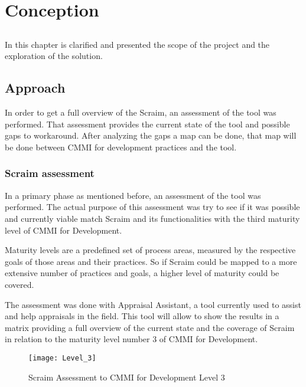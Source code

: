\chapter{Conception} \label{chap:conception}

\section*{}

In this chapter is clarified and presented the scope of the project and the exploration of the solution.

\section{Approach} \label{sec:Approach}
In order to get a full overview of the Scraim, an assessment of the tool was performed. That assessment provides the current state of the tool and possible gaps to workaround.
After analyzing the gaps a map can be done, that map will be done between CMMI for development practices and the tool.

\subsection{Scraim assessment}
In a primary phase as mentioned before, an assessment of the tool was performed. The actual purpose of this assessment was try to see if it was possible and currently viable match Scraim and its functionalities with the third maturity level of CMMI for Development.

Maturity levels are a predefined set of process areas, measured by the respective goals of those areas and their practices. So if Scraim could be mapped to a more extensive number of practices and goals, a higher level of maturity could be covered.

The assessment was done with Appraisal Assistant, a tool currently used to assist and help appraisals in the field. This tool will allow to show the results in a matrix providing a full overview of the current state and the coverage of Scraim in relation to the maturity level number 3 of CMMI for Development.


\begin{figure}[h]
	\begin{center}
		\leavevmode
		\texttt{[image: Level\_3]}
		\caption{Scraim Assessment to CMMI for Development Level 3}
		\label{fig:level3}
	\end{center}
\end{figure}

